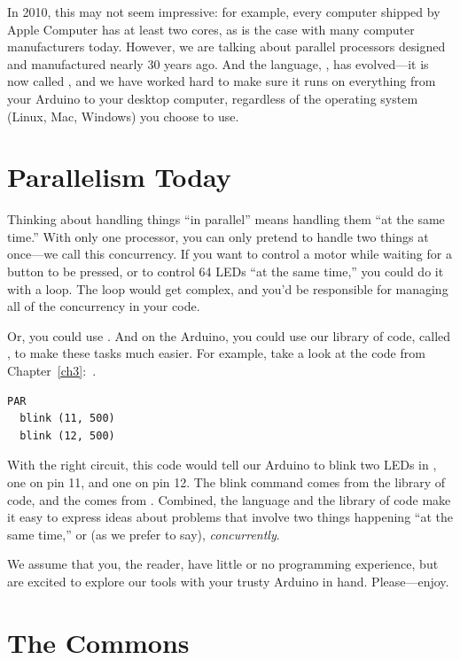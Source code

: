 In 2010, this may not seem impressive: for example, every computer shipped by Apple Computer has at least two cores, as is the case with many computer manufacturers today. However, we are talking about {\strong parallel processors designed and manufactured nearly 30 years ago}. And the language, \justoccam, has evolved---it is now called \occam, and we have worked hard to make sure it runs on everything from your Arduino to your desktop computer, regardless of the operating system (Linux, Mac, Windows) you choose to use.

\newpage

\section*{Parallelism Today}
Thinking about handling things ``in parallel'' means handling them ``at the same time.'' With only one processor, you can only pretend to handle two things at once---we call this {\strong concurrency}. If you want to control a motor while waiting for a button to be pressed, or to control 64 LEDs ``at the same time,'' you could do it with a loop. The loop would get complex, and you'd be responsible for managing all of the concurrency in your code.

Or, you could use \occam. And on the Arduino, you could use our library of code, called \plumbing, to make these tasks much easier. For example, take a look at the code from Chapter~\ref{ch3}:~. 

\vspace{3mm}
	\begin{lstlisting}[firstnumber=1]
PAR
  blink (11, 500)
  blink (12, 500)
	\end{lstlisting}

With the right circuit, this code would tell our Arduino to blink two LEDs in \PARallel, one on pin 11, and one on pin 12. The {\code blink} command comes from the \plumbing library of code, and the \PAR comes from \occam. Combined, the language and the library of code make it easy to express ideas about problems that involve two things happening ``at the same time,'' or (as we prefer to say), {\em concurrently}.

We assume that you, the reader, have little or no programming experience, but are excited to explore our tools with your trusty Arduino in hand. Please---enjoy.

\newpage

\section*{The Commons}

